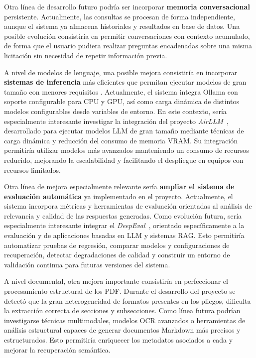 Otra línea de desarrollo futuro podría ser incorporar \textbf{memoria conversacional} persistente. Actualmente, las consultas se procesan de forma independiente, aunque el sistema ya almacena historiales y resultados en base de datos. Una posible evolución consistiría en permitir conversaciones con contexto acumulado, de forma que el usuario pudiera realizar preguntas encadenadas sobre una misma licitación sin necesidad de repetir información previa.

A nivel de modelos de lenguaje, una posible mejora consistiría en incorporar \textbf{sistemas de inferencia} más eficientes que permitan ejecutar modelos de gran tamaño con menores requisitos . Actualmente, el sistema integra Ollama con soporte configurable para CPU y GPU, así como carga dinámica de distintos modelos configurables desde variables de entorno. En este contexto, sería especialmente interesante investigar la integración del proyecto \textit{AirLLM}~\cite{trabfut:airllm}, desarrollado para ejecutar modelos LLM de gran tamaño mediante técnicas de carga dinámica y reducción del consumo de memoria VRAM. Su integración permitiría utilizar modelos más avanzados manteniendo un consumo de recursos reducido, mejorando la escalabilidad y facilitando el despliegue en equipos con recursos limitados.

Otra línea de mejora especialmente relevante sería \textbf{ampliar el sistema de evaluación automática} ya implementado en el proyecto. Actualmente, el sistema incorpora métricas y herramientas de evaluación orientadas al análisis de relevancia y calidad de las respuestas generadas. Como evolución futura, sería especialmente interesante integrar el  \textit{DeepEval}~\cite{trabfut:LLMevaluator}, orientado específicamente a la evaluación y  de aplicaciones basadas en LLM y sistemas RAG. Esto permitiría automatizar pruebas de regresión, comparar modelos y configuraciones de recuperación, detectar degradaciones de calidad y construir un entorno de validación continua para futuras versiones del sistema.

A nivel documental, otra mejora importante consistiría en perfeccionar el procesamiento estructural de los PDF. Durante el desarrollo del proyecto se detectó que la gran heterogeneidad de formatos presentes en los pliegos, dificulta la extracción correcta de secciones y subsecciones. Como línea futura podrían investigarse técnicas multimodales, modelos OCR avanzados o herramientas de análisis estructural capaces de generar documentos Markdown más precisos y estructurados. Esto permitiría enriquecer los metadatos asociados a cada  y mejorar la recuperación semántica.